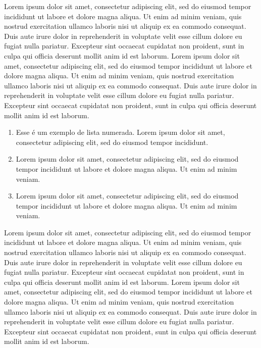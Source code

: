 \documentclass[spanish]{sbc2025}%
\begin{document}
Lorem ipsum dolor sit amet, consectetur adipiscing elit, sed do eiusmod tempor incididunt ut labore et dolore magna aliqua. Ut enim ad minim veniam, quis nostrud exercitation ullamco laboris nisi ut aliquip ex ea commodo consequat. Duis aute irure dolor in reprehenderit in voluptate velit esse cillum dolore eu fugiat nulla pariatur. Excepteur sint occaecat cupidatat non proident, sunt in culpa qui officia deserunt mollit anim id est laborum. Lorem ipsum dolor sit amet, consectetur adipiscing elit, sed do eiusmod tempor incididunt ut labore et dolore magna aliqua. Ut enim ad minim veniam, quis nostrud exercitation ullamco laboris nisi ut aliquip ex ea commodo consequat. Duis aute irure dolor in reprehenderit in voluptate velit esse cillum dolore eu fugiat nulla pariatur. Excepteur sint occaecat cupidatat non proident, sunt in culpa qui officia deserunt mollit anim id est laborum.

\begin{enumerate}%
\item Esse é um exemplo de lista numerada. Lorem ipsum dolor sit amet, consectetur adipiscing elit, sed do eiusmod tempor incididunt.
\item Lorem ipsum dolor sit amet, consectetur adipiscing elit, sed do eiusmod tempor incididunt ut labore et dolore magna aliqua. Ut enim ad minim veniam.
\item Lorem ipsum dolor sit amet, consectetur adipiscing elit, sed do eiusmod tempor incididunt ut labore et dolore magna aliqua. Ut enim ad minim veniam.
\end{enumerate}

Lorem ipsum dolor sit amet, consectetur adipiscing elit, sed do eiusmod tempor incididunt ut labore et dolore magna aliqua. Ut enim ad minim veniam, quis nostrud exercitation ullamco laboris nisi ut aliquip ex ea commodo consequat. Duis aute irure dolor in reprehenderit in voluptate velit esse cillum dolore eu fugiat nulla pariatur. Excepteur sint occaecat cupidatat non proident, sunt in culpa qui officia deserunt mollit anim id est laborum. Lorem ipsum dolor sit amet, consectetur adipiscing elit, sed do eiusmod tempor incididunt ut labore et dolore magna aliqua. Ut enim ad minim veniam, quis nostrud exercitation ullamco laboris nisi ut aliquip ex ea commodo consequat. Duis aute irure dolor in reprehenderit in voluptate velit esse cillum dolore eu fugiat nulla pariatur. Excepteur sint occaecat cupidatat non proident, sunt in culpa qui officia deserunt mollit anim id est laborum.
\end{document}
